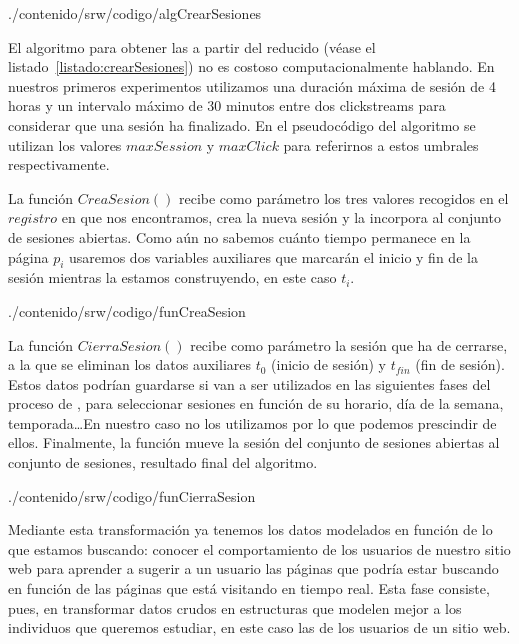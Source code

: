 
                       {./contenido/srw/codigo/algCrearSesiones}

El algoritmo para obtener las \sns a partir del \flog reducido (véase el listado~\ref{listado:crearSesiones}) no es costoso computacionalmente hablando. En nuestros primeros experimentos utilizamos una duración máxima de sesión de 4 horas y un intervalo máximo de 30 minutos entre dos clickstreams para considerar que una sesión ha finalizado. En el pseudocódigo del algoritmo se utilizan los valores $maxSession$ y $maxClick$ para referirnos a estos umbrales respectivamente.

La función $CreaSesion()$ recibe como parámetro los tres valores recogidos en el $registro$ en que nos encontramos, crea la nueva sesión y la incorpora al conjunto de sesiones abiertas. Como aún no sabemos cuánto tiempo permanece en la página $p_i$ usaremos dos variables auxiliares que marcarán el inicio y fin de la sesión mientras la estamos construyendo, en este caso $t_i$.


                       {./contenido/srw/codigo/funCreaSesion}

La función $CierraSesion()$ recibe como parámetro la sesión que ha de cerrarse, a la que se eliminan los datos auxiliares $t_0$ (inicio de sesión) y $t_{fin}$ (fin de sesión). Estos datos podrían guardarse si van a ser utilizados en las siguientes fases del proceso de \WUM, para seleccionar sesiones en función de su horario, día de la semana, temporada\ldots En nuestro caso no los utilizamos por lo que podemos prescindir de ellos. Finalmente, la función mueve la sesión del conjunto de sesiones abiertas al conjunto de sesiones, resultado final del algoritmo.


                       {./contenido/srw/codigo/funCierraSesion}

Mediante esta transformación ya tenemos los datos modelados en función de lo que estamos buscando: conocer el comportamiento de los usuarios de nuestro sitio web para aprender a sugerir a un usuario las páginas que podría estar buscando en función de las páginas que está visitando en tiempo real. Esta fase consiste, pues, en transformar datos crudos en estructuras que modelen mejor a los individuos que queremos estudiar, en este caso las \sns de los usuarios de un sitio web.


